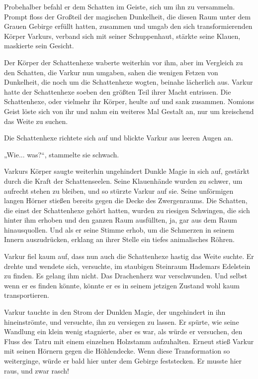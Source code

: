 \documentclass[10pt, a4paper, oneside]{book}
\begin{document}
Probehalber befahl er dem Schatten im Geiste, sich um ihn zu versammeln. Prompt floss der Großteil der magischen Dunkelheit, die diesen Raum unter dem Grauen Gebirge erfüllt hatten, zusammen und umgab den sich transformierenden Körper Varkurs, verband sich mit seiner Schuppenhaut, stärkte seine Klauen, maskierte sein Gesicht.

Der Körper der Schattenhexe waberte weiterhin vor ihm, aber im Vergleich zu den Schatten, die Varkur nun umgaben, sahen die wenigen Fetzen von Dunkelheit, die noch um die Schattenhexe wogten, beinahe lächerlich aus. Varkur hatte der Schattenhexe soeben den größten Teil ihrer Macht entrissen. Die Schattenhexe, oder vielmehr ihr Körper, heulte auf und sank zusammen. Nomions Geist löste sich von ihr und nahm ein weiteres Mal Gestalt an, nur um kreischend das Weite zu suchen.

Die Schattenhexe richtete sich auf und blickte Varkur aus leeren Augen an.

„Wie... was?“, stammelte sie schwach.

Varkurs Körper saugte weiterhin ungehindert Dunkle Magie in sich auf, gestärkt durch die Kraft der Schattenseelen. Seine Klauenhände wurden zu schwer, um aufrecht stehen zu bleiben, und so stürzte Varkur auf sie. Seine unförmigen langen Hörner stießen bereits gegen die Decke des Zwergenraums. Die Schatten, die einst der Schattenhexe gehört hatten, wurden zu riesigen Schwingen, die sich hinter ihm erhoben und den ganzen Raum ausfüllten, ja, gar aus dem Raum hinausquollen. Und als er seine Stimme erhob, um die Schmerzen in seinem Innern auszudrücken, erklang an ihrer Stelle ein tiefes animalisches Röhren.

Varkur fiel kaum auf, dass nun auch die Schattenhexe hastig das Weite suchte. Er drehte und wendete sich, versuchte, im staubigen Steinraum Hademars Edelstein zu finden. Es gelang ihm nicht. Das Drachenherz war verschwunden. Und selbst wenn er es finden könnte, könnte er es in seinem jetzigen Zustand wohl kaum transportieren.

Varkur tauchte in den Strom der Dunklen Magie, der ungehindert in ihn hineinströmte, und versuchte, ihn zu versiegen zu lassen. Er spürte, wie seine Wandlung ein klein wenig stagnierte, aber es war, als würde er versuchen, den Fluss des Tatru mit einem einzelnen Holzstamm aufzuhalten. Erneut stieß Varkur mit seinen Hörnern gegen die Höhlendecke. Wenn diese Transformation so weiterginge, würde er bald hier unter dem Gebirge feststecken. Er musste hier raus, und zwar rasch!
\end{document}
